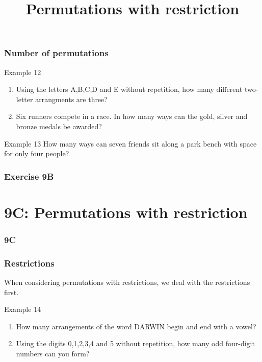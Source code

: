 \documentclass[
	11pt, %
]{beamer}
\begin{document}
\begin{frame}[t]
    \frametitle{Number of permutations}
    \begin{block}{Example 12}
        \begin{enumerate}
            \item Using the letters A,B,C,D and E without repetition, how many different two-letter arrangments are three?
            \item Six runners compete in a race. In how many ways can the gold, silver and bronze medals be awarded?
        \end{enumerate}        
    \end{block}
    \begin{block}{Example 13}
        How many ways can seven friends sit along a park bench with space for only four people?
    \end{block}
\end{frame}

\begin{frame}
    \frametitle{Exercise 9B}
\end{frame}


\section{9C: Permutations with restriction}
\begin{frame}
    \frametitle{9C}
    \begin{center}
        \title{Permutations with restriction}
        \maketitle
    \end{center}
\end{frame}

\begin{frame}[t]
    \frametitle{Restrictions}
    When considering permutations with restrictions, we deal with the restrictions first.
    \begin{block}{Example 14}
        \begin{enumerate}
            \item How many arrangements of the word DARWIN begin and end with a vowel?
            \item Using the digits 0,1,2,3,4 and 5 without repetition, how many odd four-digit numbers can you form?
        \end{enumerate}
    \end{block}
\end{frame}
\end{document}
